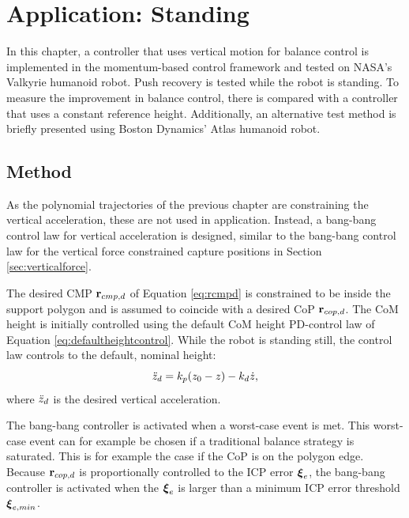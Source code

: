 \chapter{Application: Standing}\label{chap:standing}
In this chapter, a controller that uses vertical motion for balance control is implemented in the momentum-based control framework and tested on NASA's Valkyrie \cite{radford2015valkyrie} humanoid robot. Push recovery is tested while the robot is standing. To measure the improvement in balance control, there is compared with a controller that uses a constant reference height. Additionally, an alternative test method is briefly presented using Boston Dynamics' Atlas humanoid robot.

\section{Method}
As the polynomial trajectories of the previous chapter are constraining the vertical acceleration, these are not used in application. Instead, a bang-bang control law for vertical acceleration is designed, similar to the bang-bang control law for the vertical force constrained capture positions in Section \ref{sec:verticalforce}.

The desired \ac{CMP} $\mathbf{r}_{cmp,d}$ of Equation \eqref{eq:rcmpd} is constrained to be inside the support polygon and is assumed to coincide with a desired \ac{CoP} $\mathbf{r}_{cop,d}$. The \ac{CoM} height is initially controlled using the default \ac{CoM} height PD-control law of Equation \eqref{eq:defaultheightcontrol}.  While the robot is standing still, the control law controls to the default, nominal height:
\begin{equation}
\ddot{z}_d =k_p(z_0-z) - k_d\dot{z},
\end{equation}
where $\ddot{z}_d$ is the desired vertical acceleration. 

The bang-bang controller is activated when a worst-case event is met. This worst-case event can for example be chosen if a traditional balance strategy is saturated. This is for example the case if the \ac{CoP} is on the polygon edge. Because $\mathbf{r}_{cop,d}$ is proportionally controlled to the \ac{ICP} error $\boldsymbol{\xi}_e$, the bang-bang controller is activated when the $\boldsymbol{\xi}_e$ is larger than a minimum \ac{ICP} error threshold $\boldsymbol{\xi}_{e,min}$. 

